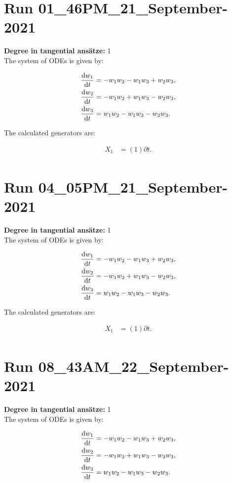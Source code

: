 \section*{Run 01\_46PM\_21\_September-2021}
\textbf{Degree in tangential ansätze:}	1\\
The system of ODEs is given by:

\begin{align*}
\dv{w_{1}}{t}&=- w_{1} w_{2} - w_{1} w_{3} + w_{2} w_{3},\\
\dv{w_{2}}{t}&=- w_{1} w_{2} + w_{1} w_{3} - w_{2} w_{3},\\
\dv{w_{3}}{t}&=w_{1} w_{2} - w_{1} w_{3} - w_{2} w_{3}.\\
\end{align*}

\noindent The calculated generators are:

\begin{align*}
X_{1}&=\left( 1 \right)\partial t.\\
\end{align*}
\section*{Run 04\_05PM\_21\_September-2021}
\textbf{Degree in tangential ansätze:}	1\\
The system of ODEs is given by:

\begin{align*}
\dv{w_{1}}{t}&=- w_{1} w_{2} - w_{1} w_{3} + w_{2} w_{3},\\
\dv{w_{2}}{t}&=- w_{1} w_{2} + w_{1} w_{3} - w_{2} w_{3},\\
\dv{w_{3}}{t}&=w_{1} w_{2} - w_{1} w_{3} - w_{2} w_{3}.\\
\end{align*}

\noindent The calculated generators are:

\begin{align*}
X_{1}&=\left( 1 \right)\partial t.\\
\end{align*}
\section*{Run 08\_43AM\_22\_September-2021}
\textbf{Degree in tangential ansätze:}	1\\
The system of ODEs is given by:

\begin{align*}
\dv{w_{1}}{t}&=- w_{1} w_{2} - w_{1} w_{3} + w_{2} w_{3},\\
\dv{w_{2}}{t}&=- w_{1} w_{2} + w_{1} w_{3} - w_{2} w_{3},\\
\dv{w_{3}}{t}&=w_{1} w_{2} - w_{1} w_{3} - w_{2} w_{3}.\\
\end{align*}

